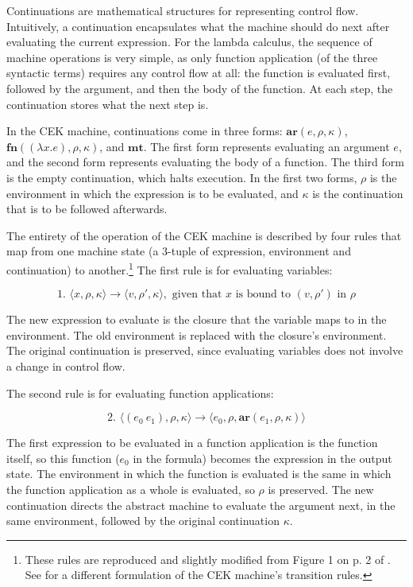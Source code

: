 \documentclass{article}
\begin{document}
Continuations are mathematical structures for representing control flow. Intuitively, a continuation encapsulates what the machine should do next after evaluating the current expression. For the lambda calculus, the sequence of machine operations is very simple, as only function application (of the three syntactic terms) requires any control flow at all: the function is evaluated first, followed by the argument, and then the body of the function. At each step, the continuation stores what the next step is.

In the CEK machine, continuations come in three forms: $\textbf{ar}(e, \rho, \kappa)$, $\textbf{fn}((\lambda x.e), \rho, \kappa)$, and $\textbf{mt}$. The first form represents evaluating an argument $e$, and the second form represents evaluating the body of a function. The third form is the empty continuation, which halts execution. In the first two forms, $\rho$ is the environment in which the expression is to be evaluated, and $\kappa$ is the continuation that is to be followed afterwards.

The entirety of the operation of the CEK machine is described by four rules that map from one machine state (a 3-tuple of expression, environment and continuation) to another.\footnote{These rules are reproduced and slightly modified from Figure 1 on p. 2 of \cite{aam}. See \cite{cek} for a different formulation of the CEK machine's transition rules.} The first rule is for evaluating variables:

$$
\text{1. }
\langle x, \rho, \kappa \rangle
\to
\langle v, \rho', \kappa \rangle,
\text{ given that $x$ is bound to $(v, \rho')$ in $\rho$}
$$

The new expression to evaluate is the closure that the variable maps to in the environment. The old environment is replaced with the closure's environment. The original continuation is preserved, since evaluating variables does not involve a change in control flow.

The second rule is for evaluating function applications:

$$
\text{2. }
\langle (e_0\ e_1), \rho, \kappa \rangle
\to
\langle e_0, \rho, \textbf{ar}(e_1, \rho, \kappa) \rangle
$$

The first expression to be evaluated in a function application is the function itself, so this function ($e_0$ in the formula) becomes the expression in the output state. The environment in which the function is evaluated is the same in which the function application as a whole is evaluated, so $\rho$ is preserved. The new continuation directs the abstract machine to evaluate the argument next, in the same environment, followed by the original continuation $\kappa$.
\end{document}
